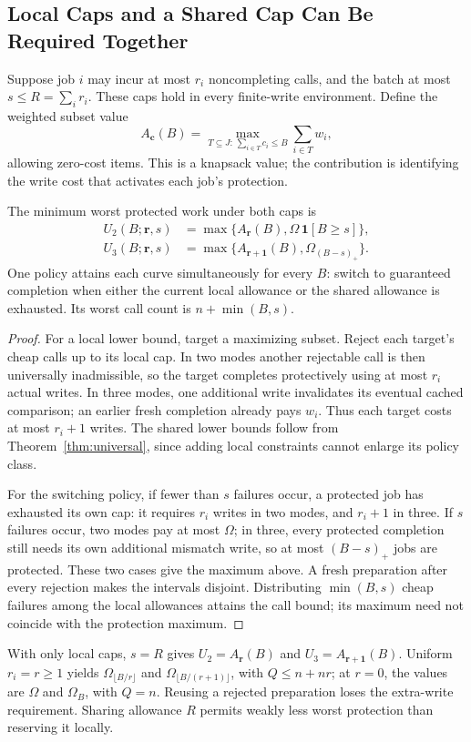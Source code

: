 \subsection{Local Caps and a Shared Cap Can Be Required Together}

Suppose job $i$ may incur at most $r_i$ noncompleting calls, and the batch at most $s\le R=\sum_i r_i$. These caps hold in every finite-write environment. Define the weighted subset value
\[
 A_{\boldsymbol c}(B)=\max_{T\subseteq J:\,\sum_{i\in T}c_i\le B}\sum_{i\in T}w_i,
\]
allowing zero-cost items. This is a knapsack value; the contribution is identifying the write cost that activates each job's protection.
\begin{proposition}
\label{prop:localcaps}
The minimum worst protected work under both caps is
\[
\begin{aligned}
 U_2(B;\boldsymbol r,s)&=\max\{A_{\boldsymbol r}(B),\Omega\,\mathbf1[B\ge s]\},\\
 U_3(B;\boldsymbol r,s)&=\max\{A_{\boldsymbol r+\boldsymbol1}(B),\Omega_{(B-s)_+}\}.
\end{aligned}
\]
One policy attains each curve simultaneously for every $B$: switch to guaranteed completion when either the current local allowance or the shared allowance is exhausted. Its worst call count is $n+\min(B,s)$.
\end{proposition}
\begin{proof}
For a local lower bound, target a maximizing subset. Reject each target's cheap calls up to its local cap. In two modes another rejectable call is then universally inadmissible, so the target completes protectively using at most $r_i$ actual writes. In three modes, one additional write invalidates its eventual cached comparison; an earlier fresh completion already pays $w_i$. Thus each target costs at most $r_i+1$ writes. The shared lower bounds follow from Theorem~\ref{thm:universal}, since adding local constraints cannot enlarge its policy class.

For the switching policy, if fewer than $s$ failures occur, a protected job has exhausted its own cap: it requires $r_i$ writes in two modes, and $r_i+1$ in three. If $s$ failures occur, two modes pay at most $\Omega$; in three, every protected completion still needs its own additional mismatch write, so at most $(B-s)_+$ jobs are protected. These two cases give the maximum above. A fresh preparation after every rejection makes the intervals disjoint. Distributing $\min(B,s)$ cheap failures among the local allowances attains the call bound; its maximum need not coincide with the protection maximum.
\end{proof}

With only local caps, $s=R$ gives $U_2=A_{\boldsymbol r}(B)$ and $U_3=A_{\boldsymbol r+\boldsymbol1}(B)$. Uniform $r_i=r\ge1$ yields $\Omega_{\lfloor B/r\rfloor}$ and $\Omega_{\lfloor B/(r+1)\rfloor}$, with $Q\le n+nr$; at $r=0$, the values are $\Omega$ and $\Omega_B$, with $Q=n$. Reusing a rejected preparation loses the extra-write requirement. Sharing allowance $R$ permits weakly less worst protection than reserving it locally.

